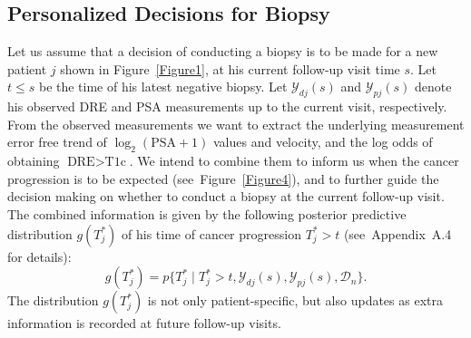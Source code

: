 \documentclass[a4paper, 12pt]{article}
\begin{document}
\subsection{Personalized Decisions for Biopsy}
\label{subsec:pers_decision_making}
Let us assume that a decision of conducting a biopsy is to be made for a new patient $j$ shown in Figure~\ref{Figure1}, at his current follow-up visit time $s$. Let $t\leq s$ be the time of his latest negative biopsy. Let $\mathcal{Y}_{dj}(s)$ and $\mathcal{Y}_{pj}(s)$ denote his observed DRE and PSA measurements up to the current visit, respectively. From the observed measurements we want to extract the underlying measurement error free trend of $\log_2 (\mbox{PSA} + 1)$ values and velocity, and the log odds of obtaining $\mbox{DRE} > \mbox{T1c}$. We intend to combine them to inform us when the cancer progression is to be expected (see~Figure~\ref{Figure4}), and to further guide the decision making on whether to conduct a biopsy at the current follow-up visit. The combined information is given by the following posterior predictive distribution $g(T^*_j)$ of his time of cancer progression $T^*_j > t$ (see~Appendix~A.4 for details):
\begin{equation}
\label{eq:post_pred_dist}
g(T^*_j) = p\big\{T^*_j \mid T^*_j > t, \mathcal{Y}_{dj}(s), \mathcal{Y}_{pj}(s), \mathcal{D}_n\big\}.
\end{equation}
The distribution $g(T^*_j)$ is not only patient-specific, but also updates as extra information is recorded at future follow-up visits.
\end{document}
